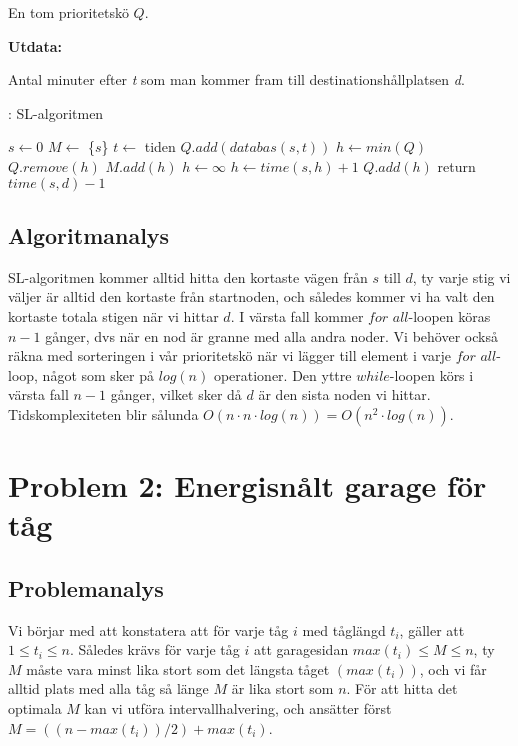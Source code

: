 \documentclass[11pt]{exam}
\begin{document}
En tom prioritetskö $Q$.

\textbf{Utdata:}

Antal minuter efter \textit{t} som man kommer fram till destinationshållplatsen \textit{d}.

\newpage
\begin{algorithm}
	\caption{: SL-algoritmen}
	\label{alg1}
	\begin{algorithmic} [1]
		\STATE $s \leftarrow 0$
		\STATE $M \leftarrow$ \{$s$\}
		\STATE $t \leftarrow$ tiden
		\STATE $Q.add(databas(s, t))$
			\STATE $h \leftarrow min(Q)$ 
			\STATE $Q.remove(h)$ 
			\STATE $M.add(h)$ 
					\STATE $h \leftarrow \infty$ 
				\ELSE 
					\STATE $h \leftarrow time(s,h) + 1$ 
					\STATE $Q.add(h)$
				\ENDIF
			\ENDFOR
		\ENDWHILE
		\STATE return $time(s,d) - 1$
	\end{algorithmic}
\end{algorithm}

\subsection{Algoritmanalys}
SL-algoritmen kommer alltid hitta den kortaste vägen från $s$ till $d$, ty varje stig vi väljer är alltid den kortaste från startnoden, och således kommer vi ha valt den kortaste totala stigen när vi hittar $d$. I värsta fall kommer $for$ $all$-loopen köras $n - 1$ gånger, dvs när en nod är granne med alla andra noder. Vi behöver också räkna med sorteringen i vår prioritetskö när vi lägger till element i varje $for$ $all$-loop, något som sker på $log(n)$ operationer. Den yttre $while$-loopen körs i värsta fall $n - 1$ gånger, vilket sker då $d$ är den sista noden vi hittar. Tidskomplexiteten blir sålunda $O(n \cdot n \cdot log(n)) = O(n^2\cdot log(n))$.

\pagebreak
\newpage

\section{Problem 2: Energisnålt garage för tåg}

\subsection{Problemanalys}
Vi börjar med att konstatera att för varje tåg $i$ med tåglängd $t_i$, gäller att $1 \leq t_i \leq n$. Således krävs för varje tåg $i$ att garagesidan $max(t_i) \leq M \leq n$, ty $M$ måste vara minst lika stort som det längsta tåget $(max(t_i))$, och vi får alltid plats med alla tåg så länge $M$ är lika stort som $n$. För att hitta det optimala $M$ kan vi utföra intervallhalvering, och ansätter först $M = ((n - max(t_i)) / 2) + max(t_i)$. 
\end{document}
